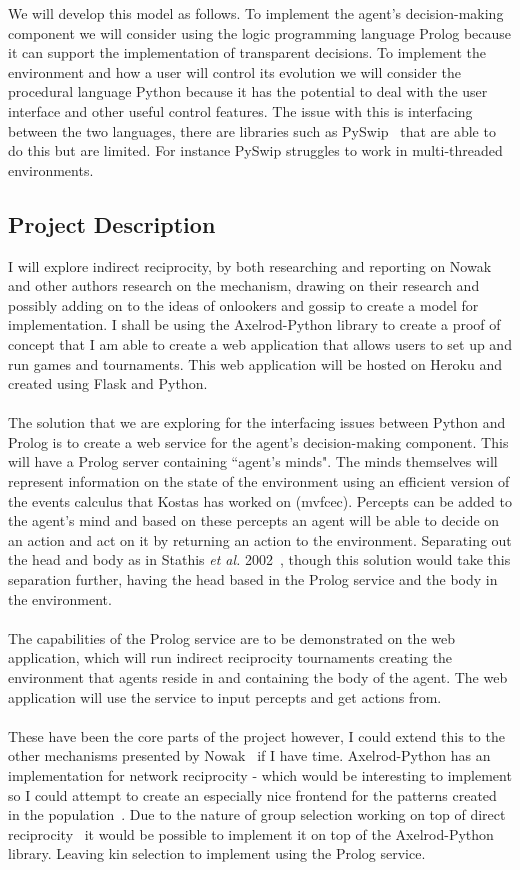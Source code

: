 \documentclass{article}
\begin{document}
We will develop this model as follows. To implement the agent's decision-making component we will consider using the logic programming language Prolog because it can support the implementation of transparent decisions. To implement the environment and how a user will control its evolution we will consider the procedural language Python because it has the potential to deal with the user interface and other useful control features. The issue with this is interfacing between the two languages, there are libraries such as PySwip~\cite{pyswip} that are able to do this but are limited. For instance PySwip struggles to work in multi-threaded environments.

\subsection*{Project Description}
I will explore indirect reciprocity, by both researching and reporting on Nowak and other authors research on the mechanism, drawing on their research and possibly adding on to the ideas of onlookers and gossip to create a model for implementation. I shall be using the Axelrod-Python library to create a proof of concept that I am able to create a web application that allows users to set up and run games and tournaments. This web application will be hosted on Heroku and created using Flask and Python.\\\\
The solution that we are exploring for the interfacing issues between Python and Prolog is to create a web service for the agent's decision-making component. This will have a Prolog server containing ``agent's minds". The minds themselves will represent information on the state of the environment using an efficient version of the events calculus that Kostas has worked on (mvfcec). Percepts can be added to the agent's mind and based on these percepts an agent will be able to decide on an action and act on it by returning an action to the environment. Separating out the head and body as in Stathis \textit{et al.} 2002~\cite{prosocs}, though this solution would take this separation further, having the head based in the Prolog service and the body in the environment.\\\\
The capabilities of the Prolog service are to be demonstrated on the web application, which will run indirect reciprocity tournaments creating the environment that agents reside in and containing the body of the agent. The web application will use the service to input percepts and get actions from.\\\\
These have been the core parts of the project however, I could extend this to the other mechanisms presented by Nowak~\cite{five_rules_coop} if I have time. Axelrod-Python has an implementation for network reciprocity - which would be interesting to implement so I could attempt to create an especially nice frontend for the patterns created in the population~\cite{spatial}. Due to the nature of group selection working on top of direct reciprocity~\cite{multilevel_nowak} it would be possible to implement it on top of the Axelrod-Python library. Leaving kin selection to implement using the Prolog service.
\end{document}
